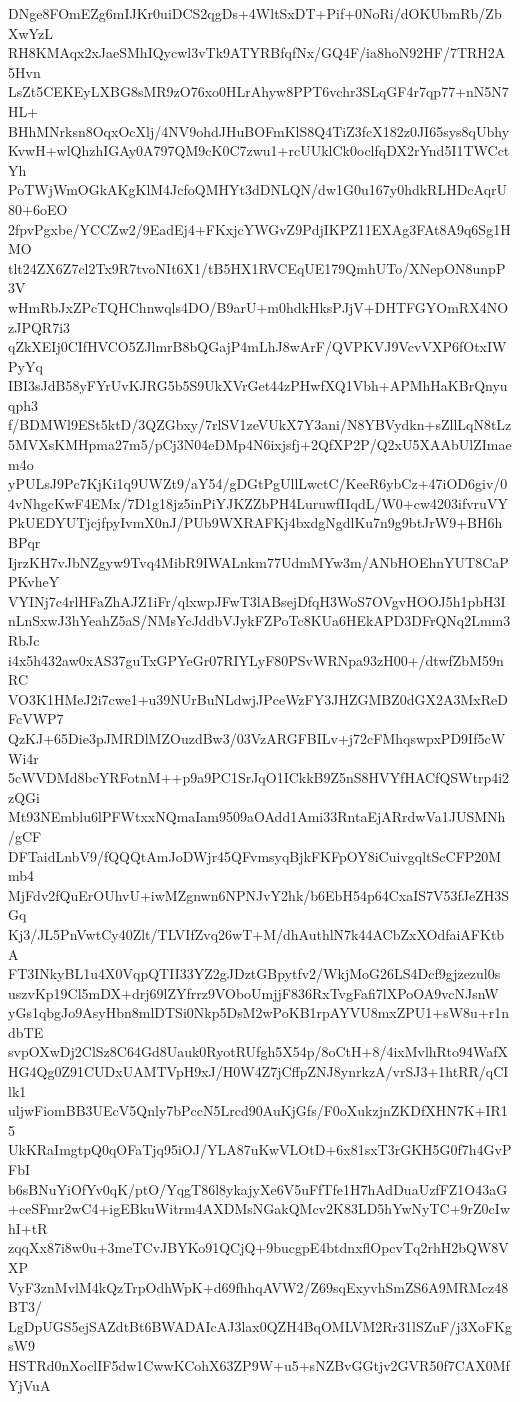 DNge8FOmEZg6mIJKr0uiDCS2qgDs+4WltSxDT+Pif+0NoRi/dOKUbmRb/ZbXwYzL
RH8KMAqx2xJaeSMhIQycwl3vTk9ATYRBfqfNx/GQ4F/ia8hoN92HF/7TRH2A5Hvn
LsZt5CEKEyLXBG8sMR9zO76xo0HLrAhyw8PPT6vchr3SLqGF4r7qp77+nN5N7HL+
BHhMNrksn8OqxOcXlj/4NV9ohdJHuBOFmKlS8Q4TiZ3fcX182z0JI65sys8qUbhy
KvwH+wlQhzhIGAy0A797QM9cK0C7zwu1+rcUUklCk0oclfqDX2rYnd5I1TWCctYh
PoTWjWmOGkAKgKlM4JcfoQMHYt3dDNLQN/dw1G0u167y0hdkRLHDcAqrU80+6oEO
2fpvPgxbe/YCCZw2/9EadEj4+FKxjcYWGvZ9PdjIKPZ11EXAg3FAt8A9q6Sg1HMO
tlt24ZX6Z7cl2Tx9R7tvoNIt6X1/tB5HX1RVCEqUE179QmhUTo/XNepON8unpP3V
wHmRbJxZPcTQHChnwqls4DO/B9arU+m0hdkHksPJjV+DHTFGYOmRX4NOzJPQR7i3
qZkXEIj0CIfHVCO5ZJlmrB8bQGajP4mLhJ8wArF/QVPKVJ9VcvVXP6fOtxIWPyYq
IBI3sJdB58yFYrUvKJRG5b5S9UkXVrGet44zPHwfXQ1Vbh+APMhHaKBrQnyuqph3
f/BDMWl9ESt5ktD/3QZGbxy/7rlSV1zeVUkX7Y3ani/N8YBVydkn+sZllLqN8tLz
5MVXsKMHpma27m5/pCj3N04eDMp4N6ixjsfj+2QfXP2P/Q2xU5XAAbUlZImaem4o
yPULsJ9Pc7KjKi1q9UWZt9/aY54/gDGtPgUllLwctC/KeeR6ybCz+47iOD6giv/0
4vNhgcKwF4EMx/7D1g18jz5inPiYJKZZbPH4LuruwfIIqdL/W0+cw4203ifvruVY
PkUEDYUTjcjfpyIvmX0nJ/PUb9WXRAFKj4bxdgNgdlKu7n9g9btJrW9+BH6hBPqr
IjrzKH7vJbNZgyw9Tvq4MibR9IWALnkm77UdmMYw3m/ANbHOEhnYUT8CaPPKvheY
VYINj7c4rlHFaZhAJZ1iFr/qlxwpJFwT3lABsejDfqH3WoS7OVgvHOOJ5h1pbH3I
nLnSxwJ3hYeahZ5aS/NMsYcJddbVJykFZPoTc8KUa6HEkAPD3DFrQNq2Lmm3RbJc
i4x5h432aw0xAS37guTxGPYeGr07RIYLyF80PSvWRNpa93zH00+/dtwfZbM59nRC
VO3K1HMeJ2i7cwe1+u39NUrBuNLdwjJPceWzFY3JHZGMBZ0dGX2A3MxReDFcVWP7
QzKJ+65Die3pJMRDlMZOuzdBw3/03VzARGFBILv+j72cFMhqswpxPD9If5cWWi4r
5cWVDMd8bcYRFotnM++p9a9PC1SrJqO1ICkkB9Z5nS8HVYfHACfQSWtrp4i2zQGi
Mt93NEmblu6lPFWtxxNQmaIam9509aOAdd1Ami33RntaEjARrdwVa1JUSMNh/gCF
DFTaidLnbV9/fQQQtAmJoDWjr45QFvmsyqBjkFKFpOY8iCuivgqltScCFP20Mmb4
MjFdv2fQuErOUhvU+iwMZgnwn6NPNJvY2hk/b6EbH54p64CxaIS7V53fJeZH3SGq
Kj3/JL5PnVwtCy40Zlt/TLVIfZvq26wT+M/dhAuthlN7k44ACbZxXOdfaiAFKtbA
FT3INkyBL1u4X0VqpQTII33YZ2gJDztGBpytfv2/WkjMoG26LS4Dcf9gjzezul0s
uszvKp19Cl5mDX+drj69lZYfrrz9VOboUmjjF836RxTvgFafi7lXPoOA9vcNJsnW
yGs1qbgJo9AsyHbn8mlDTSi0Nkp5DsM2wPoKB1rpAYVU8mxZPU1+sW8u+r1ndbTE
svpOXwDj2ClSz8C64Gd8Uauk0RyotRUfgh5X54p/8oCtH+8/4ixMvlhRto94WafX
HG4Qg0Z91CUDxUAMTVpH9xJ/H0W4Z7jCffpZNJ8ynrkzA/vrSJ3+1htRR/qCIlk1
uljwFiomBB3UEcV5Qnly7bPccN5Lrcd90AuKjGfs/F0oXukzjnZKDfXHN7K+IR15
UkKRaImgtpQ0qOFaTjq95iOJ/YLA87uKwVLOtD+6x81sxT3rGKH5G0f7h4GvPFbI
b6sBNuYiOfYv0qK/ptO/YqgT86l8ykajyXe6V5uFfTfe1H7hAdDuaUzfFZ1O43aG
+ceSFmr2wC4+igEBkuWitrm4AXDMsNGakQMcv2K83LD5hYwNyTC+9rZ0cIwhI+tR
zqqXx87i8w0u+3meTCvJBYKo91QCjQ+9bucgpE4btdnxflOpcvTq2rhH2bQW8VXP
VyF3znMvlM4kQzTrpOdhWpK+d69fhhqAVW2/Z69sqExyvhSmZS6A9MRMcz48BT3/
LgDpUGS5ejSAZdtBt6BWADAIcAJ3lax0QZH4BqOMLVM2Rr31lSZuF/j3XoFKgsW9
HSTRd0nXoclIF5dw1CwwKCohX63ZP9W+u5+sNZBvGGtjv2GVR50f7CAX0MfYjVuA
